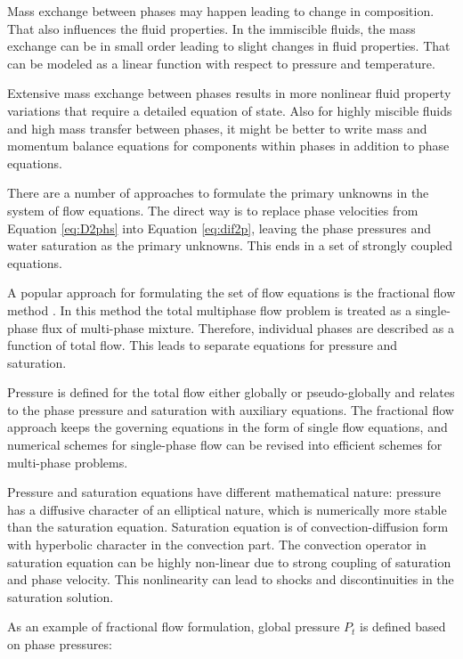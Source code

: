 Mass exchange between phases may happen leading to change in composition. That
also influences the fluid properties. In the immiscible fluids, the mass
exchange can be in small
order leading to slight changes in fluid properties. That can be modeled as a
linear function with respect to pressure and temperature. 
 
Extensive mass exchange between phases results in more nonlinear fluid property
variations that require a detailed equation of state. Also for highly miscible
fluids and high mass transfer between phases, it might be better to write mass
and momentum balance equations for components within phases in addition to phase
equations.
 
There are a number of approaches to formulate the primary unknowns in the system
of
flow equations. The direct way is to replace phase velocities from Equation
\ref{eq:D2phs} into Equation \ref{eq:dif2p}, leaving the phase pressures and
water saturation as the primary unknowns. This ends in a set of strongly coupled
equations. 
 
A popular approach for formulating the set of flow equations is the fractional
flow method \cite{binning1999practical}. In this method the total multiphase
flow problem is treated as a
single-phase flux of multi-phase mixture. Therefore, individual phases are
described as a function of total flow. This leads to separate equations for
pressure and saturation. 
 
Pressure is defined for the total flow either globally or pseudo-globally and relates to the phase pressure and saturation with auxiliary
equations. The fractional flow approach keeps the governing equations in the
form of single flow equations, and numerical schemes for single-phase flow can
be revised into efficient schemes for multi-phase problems.
 
Pressure and saturation equations have different mathematical nature: pressure
has a diffusive character of an elliptical nature, which is numerically more
stable than the saturation equation. Saturation equation is of
convection-diffusion form with hyperbolic character in the convection part. The
convection operator in saturation equation can be highly non-linear due to
strong coupling of saturation and phase velocity. This nonlinearity can lead to
shocks and discontinuities in the saturation solution.
 
As an example of fractional flow formulation, global pressure $P_t$ is defined
based on phase pressures:
 
